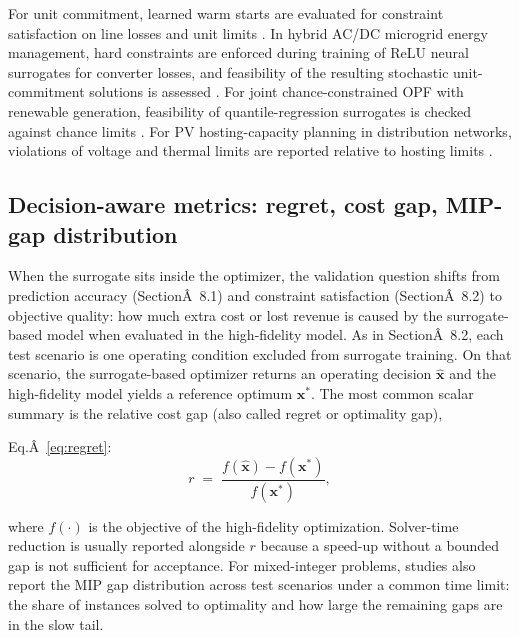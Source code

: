 \documentclass[final,5p,times,twocolumn]{elsarticle}
\begin{document}
For unit commitment, learned warm starts are evaluated for constraint
satisfaction on line losses and unit limits \cite{Chen2022}. In hybrid AC/DC
microgrid energy management, hard constraints are enforced during
training of ReLU neural surrogates for converter losses, and feasibility
of the resulting stochastic unit- commitment solutions is assessed
\cite{Liu20242534}. For joint chance-constrained OPF with renewable
generation, feasibility of quantile-regression surrogates is checked
against chance limits \cite{Chen2023657}. For PV hosting-capacity planning
in distribution networks, violations of voltage and thermal limits are
reported relative to hosting limits \cite{Koirala20242284}.

\subsection{Decision-aware metrics: regret, cost gap, MIP-gap distribution}
\label{sec:val:decision}

When the surrogate sits inside the optimizer, the validation question
shifts from prediction accuracy
(SectionÂ~8.1) and constraint satisfaction
(SectionÂ~8.2) to objective quality: how much extra
cost or lost revenue is caused by the surrogate-based model when
evaluated in the high-fidelity model. As in
SectionÂ~8.2, each test scenario is one operating
condition excluded from surrogate training. On that scenario, the
surrogate-based optimizer returns an operating decision
$\hat{\mathbf{x}}$ and the high-fidelity model yields a reference
optimum $\mathbf{x}^{*}$. The most common scalar summary is the relative
cost gap (also called regret or optimality gap),

Eq.Â~\eqref{eq:regret}: $$\begin{equation}
  r \;=\; \frac{f(\hat{\mathbf{x}}) - f(\mathbf{x}^{*})}{f(\mathbf{x}^{*})},
  \label{eq:regret}
\end{equation}$$

where $f(\cdot)$ is the objective of the high-fidelity optimization.
Solver-time reduction is usually reported alongside $r$ because a
speed-up without a bounded gap is not sufficient for acceptance. For
mixed-integer problems, studies also report the MIP gap distribution
across test scenarios under a common time limit: the share of instances
solved to optimality and how large the remaining gaps are in the slow
tail.
\end{document}
